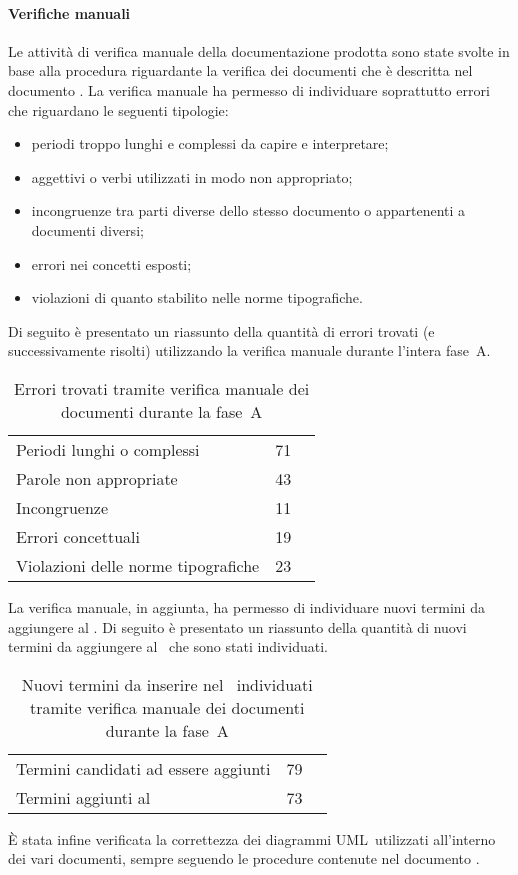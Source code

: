 \documentclass[../PianoDiQualifica.tex]{subfiles}
\begin{document}
\begin{appendices}
			\paragraph{Verifiche manuali}
			Le attività di verifica manuale della documentazione prodotta sono state svolte in base alla procedura riguardante la verifica dei documenti che è descritta nel documento \normediprogettov. La verifica manuale ha permesso di individuare soprattutto errori che riguardano le seguenti tipologie:
			\begin{itemize}
				\item periodi troppo lunghi e complessi da capire e interpretare;
				\item aggettivi o verbi utilizzati in modo non appropriato;
				\item incongruenze tra parti diverse dello stesso documento o appartenenti a documenti diversi;
				\item errori nei concetti esposti;
				\item violazioni di quanto stabilito nelle norme tipografiche.
			\end{itemize}
			Di seguito è presentato un riassunto della quantità di errori trovati (e successivamente risolti) utilizzando la verifica manuale durante l'intera fase\g\ A.
\begin{table}[H]
		\centering
		\begin{tabular}{l * {2}{c}}
			\midrule
			Periodi lunghi o complessi &	71 \\
			Parole non appropriate & 43 \\
			Incongruenze & 11 \\
			Errori concettuali & 19 \\
			Violazioni delle norme tipografiche & 23 \\
			\midrule
		\end{tabular}
		\caption{Errori trovati tramite verifica manuale dei documenti durante la fase\g\ A}
		\label{tab:errori_manuale}
\end{table}
			La verifica manuale, in aggiunta, ha permesso di individuare nuovi termini da aggiungere al \glossario. Di seguito è presentato un riassunto della quantità di nuovi termini da aggiungere al \glossario\ che sono stati individuati.
\begin{table}[H]
		\centering
		\begin{tabular}{l * {2}{c}}
			\midrule
			Termini candidati ad essere aggiunti &	79 \\
			Termini aggiunti al \glossario & 73 \\
			\midrule
		\end{tabular}
		\caption{Nuovi termini da inserire nel \glossario\ individuati tramite verifica manuale dei documenti durante la fase\g\ A}
		\label{tab:termini_glossario}
\end{table}	
			È stata infine verificata la correttezza dei diagrammi UML\g\ utilizzati all'interno dei vari documenti, sempre seguendo le procedure contenute nel documento \normediprogettov.

\end{appendices}
\end{document}
